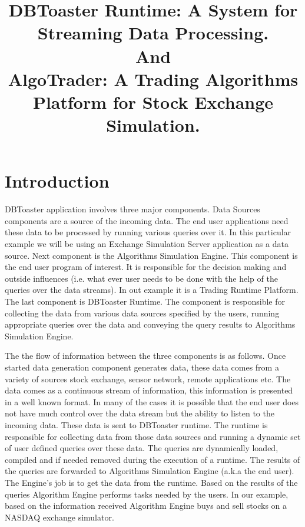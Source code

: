 \documentclass[14pt]{article}
\begin{document}
	
\title{DBToaster Runtime: A System for Streaming Data Processing. \\And\\ AlgoTrader: A Trading Algorithms Platform for Stock Exchange Simulation.}
\author{}
\maketitle

\section{Introduction}

DBToaster application involves three major components. Data Sources components are a source of the incoming data. The end user applications need these data to be processed by running various queries over it. In this particular example we will be using an Exchange Simulation Server application as a data source. Next component is the Algorithms Simulation Engine. This component is the end user program of interest. It is responsible for the decision making and outside influences (i.e. what ever user needs to be done with the help of the queries over the data streams). In out example it is a Trading Runtime Platform. The last component is DBToaster Runtime. The component is responsible for collecting the data from various data sources specified by the users, running appropriate queries over the data and conveying the query results to Algorithms Simulation Engine. 

The the flow of information between the three components is as follows. Once started data generation component generates data, these data comes from a variety of sources stock exchange, sensor network, remote applications etc. The data comes as a continuous stream of information, this information is presented in a well known format. In many of the cases it is possible that the end user does not have much control over the data stream but the ability to listen to the incoming data. These data is sent to DBToaster runtime. The runtime is responsible for collecting data from those data sources and running a dynamic set of user defined queries over these data. The queries are dynamically loaded, compiled and if needed removed during the execution of a runtime. The results of the queries are forwarded to Algorithms Simulation Engine (a.k.a the end user). The Engine's job is to get the data from the runtime. Based on the results of the queries Algorithm Engine performs tasks needed by the users. In our example, based on the information received Algorithm Engine buys and sell stocks on a NASDAQ exchange simulator. 
\end{document}
